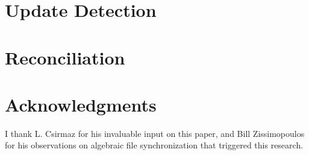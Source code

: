 \documentclass[12pt]{article}
\begin{document}




\section{Update Detection}







\section{Reconciliation}















\section{Acknowledgments}

I thank L. Csirmaz for his invaluable input on this paper,
and Bill Zissimopoulos for his observations on algebraic file synchronization that triggered this research.

\begin{thebibliography}{99}



\end{thebibliography}
\end{document}
